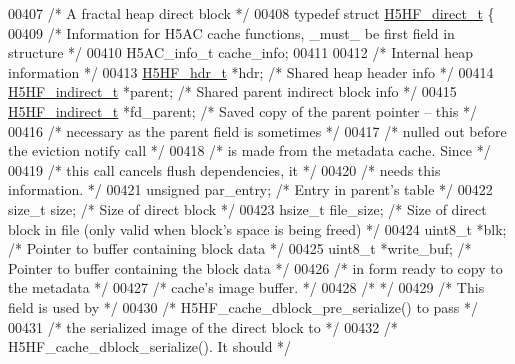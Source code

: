 \begin{DoxyCode}
00407 \textcolor{comment}{/* A fractal heap direct block */}
00408 \textcolor{keyword}{typedef} \textcolor{keyword}{struct }\hyperlink{struct_h5_h_f__direct__t}{H5HF\_direct\_t} \{
00409     \textcolor{comment}{/* Information for H5AC cache functions, \_must\_ be first field in structure */}
00410     H5AC\_info\_t cache\_info;
00411 
00412     \textcolor{comment}{/* Internal heap information */}
00413     \hyperlink{struct_h5_h_f__hdr__t}{H5HF\_hdr\_t}    *hdr;           \textcolor{comment}{/* Shared heap header info                */}
00414     \hyperlink{struct_h5_h_f__indirect__t}{H5HF\_indirect\_t} *parent; \textcolor{comment}{/* Shared parent indirect block info          */}
00415     \hyperlink{struct_h5_h_f__indirect__t}{H5HF\_indirect\_t} *fd\_parent;  \textcolor{comment}{/* Saved copy of the parent pointer -- this   */}
00416                 \textcolor{comment}{/* necessary as the parent field is sometimes */}
00417                 \textcolor{comment}{/* nulled out before the eviction notify call */}
00418                 \textcolor{comment}{/* is made from the metadata cache.  Since    */}
00419                 \textcolor{comment}{/* this call cancels flush dependencies, it   */}
00420                 \textcolor{comment}{/* needs this information.            */}
00421     \textcolor{keywordtype}{unsigned}    par\_entry;      \textcolor{comment}{/* Entry in parent's table                    */}
00422     \textcolor{keywordtype}{size\_t}      size;           \textcolor{comment}{/* Size of direct block                       */}
00423     hsize\_t     file\_size;      \textcolor{comment}{/* Size of direct block in file (only valid when block's space is being
       freed) */}
00424     uint8\_t     *blk;           \textcolor{comment}{/* Pointer to buffer containing block data    */}
00425     uint8\_t *write\_buf; \textcolor{comment}{/* Pointer to buffer containing the block data */}
00426                                 \textcolor{comment}{/* in form ready to copy to the metadata       */}
00427                                 \textcolor{comment}{/* cache's image buffer.                       */}
00428                                 \textcolor{comment}{/*                                             */}
00429                                 \textcolor{comment}{/* This field is used by                       */}
00430                                 \textcolor{comment}{/* H5HF\_cache\_dblock\_pre\_serialize() to pass   */}
00431                                 \textcolor{comment}{/* the serialized image of the direct block to */}
00432                                 \textcolor{comment}{/* H5HF\_cache\_dblock\_serialize().  It should   */}

\end{DoxyCode}
